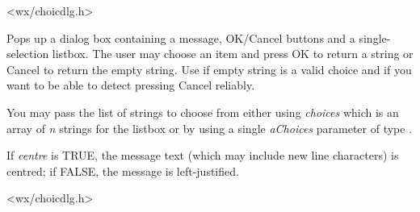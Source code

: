 
<wx/choicdlg.h>

\label{wxgetsinglechoice}



Pops up a dialog box containing a message, OK/Cancel buttons and a
single-selection listbox. The user may choose an item and press OK to return a
string or Cancel to return the empty string. Use
 if empty string is a
valid choice and if you want to be able to detect pressing Cancel reliably.

You may pass the list of strings to choose from either using {\it choices}
which is an array of {\it n} strings for the listbox or by using a single
{\it aChoices} parameter of type .

If {\it centre} is TRUE, the message text (which may include new line
characters) is centred; if FALSE, the message is left-justified.


<wx/choicdlg.h>


\label{wxgetsinglechoiceindex}

